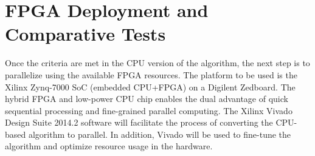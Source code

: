 \section{FPGA Deployment and Comparative Tests}
Once the criteria are met in the CPU version of the algorithm, the next step is to parallelize using the available FPGA resources.
The platform to be used is the Xilinx Zynq-7000 SoC (embedded CPU+FPGA) on a Digilent Zedboard.
The hybrid FPGA and low-power CPU chip enables the dual advantage of quick sequential processing and fine-grained parallel computing.
The Xilinx Vivado Design Suite 2014.2 software will facilitate the process of converting the CPU-based algorithm to parallel.
In addition, Vivado will be used to fine-tune the algorithm and optimize resource usage in the hardware.




